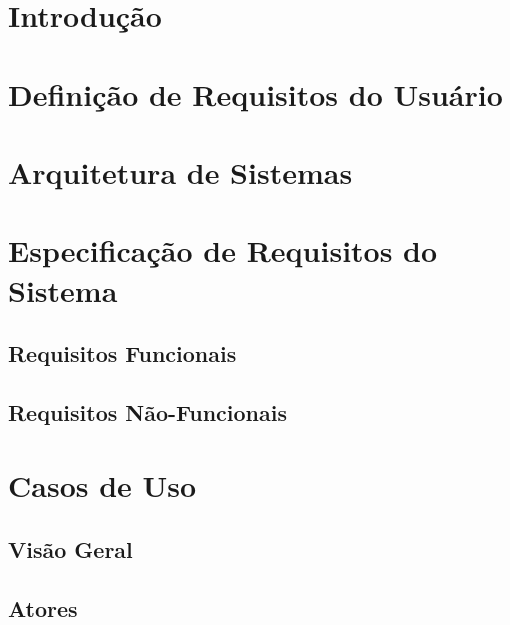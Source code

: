 \documentclass[11pt,a4paper,oneside]{article}
\begin{document}
\section{Introdução}

\section{Definição de Requisitos do Usuário}

\section{Arquitetura de Sistemas}

\section{Especificação de Requisitos do Sistema}

\subsection{Requisitos Funcionais}

\subsection{Requisitos Não-Funcionais}

\section{Casos de Uso}
\subsection{Visão Geral}
\subsection{Atores}
\end{document}
